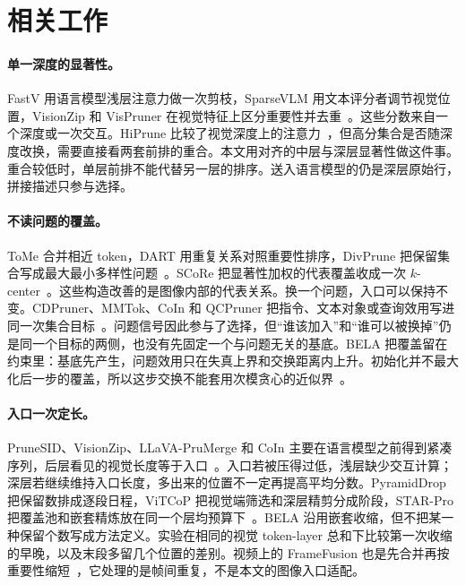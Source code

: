 \section{相关工作}
\label{sec:related}

\paragraph{单一深度的显著性。}
FastV 用语言模型浅层注意力做一次剪枝，SparseVLM 用文本评分者调节视觉位置，VisionZip 和 VisPruner 在视觉特征上区分重要性并去重~\cite{fastv,sparsevlm,visionzip,vispruner}。这些分数来自一个深度或一次交互。HiPrune 比较了视觉深度上的注意力~\cite{hiprune}，但高分集合是否随深度改换，需要直接看两套前排的重合。本文用对齐的中层与深层显著性做这件事。重合较低时，单层前排不能代替另一层的排序。送入语言模型的仍是深层原始行，拼接描述只参与选择。

\paragraph{不读问题的覆盖。}
ToMe 合并相近 token，DART 用重复关系对照重要性排序，DivPrune 把保留集合写成最大最小多样性问题~\cite{tome,dart,divprune}。SCoRe 把显著性加权的代表覆盖收成一次 $k$-center~\cite{score}。这些构造改善的是图像内部的代表关系。换一个问题，入口可以保持不变。CDPruner、MMTok、CoIn 和 QCPruner 把指令、文本对象或查询效用写进同一次集合目标~\cite{cdpruner,mmtok,coin,qcpruner}。问题信号因此参与了选择，但“谁该加入”和“谁可以被换掉”仍是同一个目标的两侧，也没有先固定一个与问题无关的基底。BELA 把覆盖留在约束里：基底先产生，问题效用只在失真上界和交换距离内上升。初始化并不最大化后一步的覆盖，所以这步交换不能套用次模贪心的近似界~\cite{linbilmes2011}。

\paragraph{入口一次定长。}
PruneSID、VisionZip、LLaVA-PruMerge 和 CoIn 主要在语言模型之前得到紧凑序列，后层看见的视觉长度等于入口~\cite{prunesid,visionzip,prumerge,coin}。入口若被压得过低，浅层缺少交互计算；深层若继续维持入口长度，多出来的位置不一定再提高平均分数。PyramidDrop 把保留数排成逐段日程，ViTCoP 把视觉端筛选和深层精剪分成阶段，STAR-Pro 把覆盖池和嵌套精炼放在同一个层均预算下~\cite{pyramiddrop,vitcop,starpro}。BELA 沿用嵌套收缩，但不把某一种保留个数写成方法定义。实验在相同的视觉 token-layer 总和下比较第一次收缩的早晚，以及末段多留几个位置的差别。视频上的 FrameFusion 也是先合并再按重要性缩短~\cite{framefusion}，它处理的是帧间重复，不是本文的图像入口适配。
